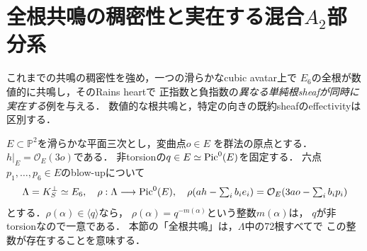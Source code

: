 \section{全根共鳴の稠密性と実在する混合\texorpdfstring{$A_2$}{A2}部分系}
\label{sec:maximal-resonance-a2}
これまでの共鳴の稠密性を強め，一つの滑らかなcubic avatar上で
$E_6$の全根が数値的に共鳴し，そのRains heartで
正指数と負指数の\emph{異なる単純根sheafが同時に実在する}例を与える．
数値的な根共鳴と，特定の向きの既約sheafのeffectivityは区別する．

$E\subset\mathbb P^2$を滑らかな平面三次とし，変曲点$o\in E$
を群法の原点とする．$h|_E=\mathcal O_E(3o)$である．
非torsionの$q\in E\simeq\operatorname{Pic}^0(E)$を固定する．
六点$p_1,\ldots,p_6\in E$のblow-upについて
\[
 \Lambda=K_S^\perp\simeq E_6,\quad
 \rho:\Lambda\longrightarrow\operatorname{Pic}^0(E),\quad
 \rho(ah-\textstyle\sum_i b_ie_i)
  =\mathcal O_E(3ao-\textstyle\sum_i b_ip_i)
\]
とする．$\rho(\alpha)\in\langle q\rangle$なら，
$\rho(\alpha)=q^{-m(\alpha)}$という整数$m(\alpha)$は，
$q$が非torsionなので一意である．
本節の「全根共鳴」は，$\Lambda$中の72根すべてで
この整数が存在することを意味する．

